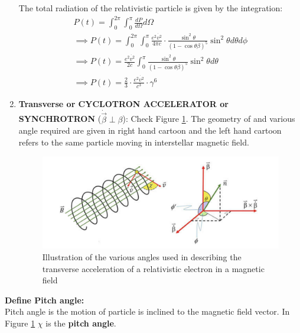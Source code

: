\documentclass[11pt]{report}
\newcommand{\tbf}[1]{\textbf{#1}}
\newcommand{\de}[2]{\frac{d{#1}}{d{#2}}}
\newcommand{\vd}[1]{\dot{\vec{#1}}}
\begin{document}
\begin{enumerate}
The total radiation of the relativistic particle is given by the integration:
\begin{eqnarray*}
P(t)=\int^{2\pi} _{0} \int^{\pi} _{0} \de{P}{\Omega} d\Omega \\
\implies P(t)=\int^{2\pi} _{0} \int^{\pi} _{0} \frac{e^2 \dot{v^2}}{4 \pi c} \cdot \frac{\sin^2 \theta}{(1- \cos \theta \beta)^5} \sin^2 \theta d\theta d\phi \\
\implies P(t)= \frac{e^2 \dot{v^2}}{2 c} \int^{\pi} _{0}  \frac{\sin^2 \theta}{(1- \cos \theta \beta)^5} \sin^2 \theta d\theta \\
\implies P(t)=\frac{2}{3}\cdot \frac{e^2 \dot{v^2}}{c^3} \cdot \gamma^6
\end{eqnarray*}

\item \tbf{Transverse or CYCLOTRON ACCELERATOR or SYNCHROTRON }($\vd{\beta} \perp \beta$): Check Figure \ref{figtrac}. The geometry of and various angle required are given in right hand cartoon and the left hand cartoon refers to the same particle moving in interstellar magnetic field. 
\begin{figure}[h!]\label{figtrac}
\includegraphics[scale=1]{figtrac}
\caption{ Illustration of the various angles used in describing the transverse acceleration of a relativistic electron in a magnetic field}
\end{figure}
\end{enumerate}
\textbf{Define Pitch angle:}\\
Pitch angle is the motion of particle is inclined to the magnetic field vector. In Figure \ref{figtrac} $\chi$ is the \textbf{pitch angle}.\\
\end{document}
